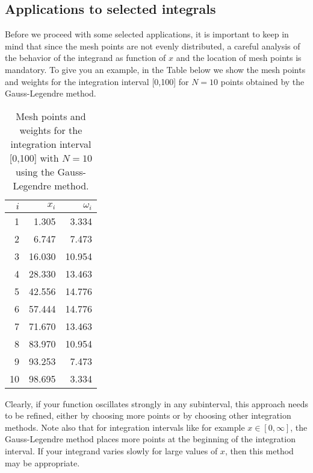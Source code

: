 \subsection{Applications to selected integrals}

Before we proceed with some selected applications, it is important to keep in mind
that since the mesh points are not evenly distributed, a careful analysis of the 
behavior of the integrand as function of $x$ and the location of mesh 
points is mandatory. To give you an example, in the Table below we show the 
mesh points and weights for the integration interval [0,100] 
for $N=10$ points obtained by the Gauss-Legendre method.
\begin{table}[hbtp]
\begin{center}
\caption{Mesh points and weights for the integration interval [0,100] with 
         $N=10$ using the Gauss-Legendre method.} 
\begin{tabular}{rrr}\hline
$i$&$x_i$&$\omega_i$\\\hline
1 &  1.305  & 3.334 \\
2 &  6.747  & 7.473 \\
3 & 16.030 & 10.954  \\
4 & 28.330 & 13.463 \\
5 & 42.556 & 14.776 \\
6 & 57.444 & 14.776 \\
7 & 71.670 & 13.463 \\
8 & 83.970 & 10.954 \\
9 & 93.253  & 7.473 \\
10&  98.695 &  3.334 \\\hline
\end{tabular} 
\end{center}   
\end{table}     
Clearly, if your function oscillates strongly in any subinterval, this 
approach needs to be refined, either by choosing more points or by choosing
other integration methods. Note also that for integration intervals 
like for example $x\in [0,\infty]$, the Gauss-Legendre method places
more points at the beginning of the integration interval.
If your integrand varies slowly for large values of $x$,
then this method may be appropriate.


